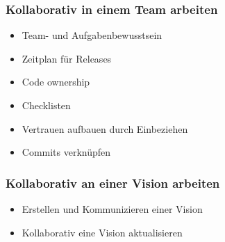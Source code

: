 \documentclass{beamer}
\begin{document}
\begin{frame}
\frametitle{Kollaborativ in einem Team arbeiten}
\begin{itemize}
 \item Team- und Aufgabenbewusstsein
 \item Zeitplan f\"ur Releases
 \item Code ownership
 \item Checklisten
 \item Vertrauen aufbauen durch Einbeziehen
 \item Commits verkn\"upfen
\end{itemize}
\end{frame}

\begin{frame}
\frametitle{Kollaborativ an einer Vision arbeiten}
\begin{itemize}
 \item Erstellen und Kommunizieren einer Vision
 \item Kollaborativ eine Vision aktualisieren
\end{itemize}
\end{frame}
\end{document}
